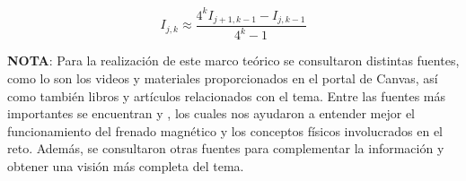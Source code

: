 \begin{equation}
    I_{j,k}\approx \frac{4^k I_{j+1,k-1} - I_{j,k-1}}{4^k - 1}
\end{equation}


\textbf{NOTA}: Para la realización de este marco teórico se consultaron distintas fuentes, como lo son los videos y materiales proporcionados en el portal de Canvas, así como también libros y artículos relacionados con el tema. Entre las fuentes más importantes se encuentran \cite{griffiths2013introduction} y \cite{hayt2006teoría}, los cuales nos ayudaron a entender mejor el funcionamiento del frenado magnético y los conceptos físicos involucrados en el reto. Además, se consultaron otras fuentes para complementar la información y obtener una visión más completa del tema.